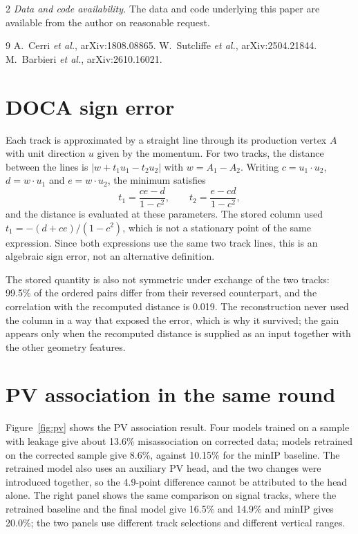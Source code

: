 \documentclass[10pt]{article}
\newcommand{\secnum}{\Roman{section}}
\begin{document}
\begin{multicols}{2}
\vspace{0.3em}
\noindent\emph{Data and code availability.} The data and code underlying this paper are available from the author on reasonable request.

\begin{thebibliography}{9}
\footnotesize
{} A.~Cerri \textit{et al.}, arXiv:1808.08865.
 W.~Sutcliffe \textit{et al.}, arXiv:2504.21844.
 M.~Barbieri \textit{et al.}, arXiv:2610.16021.
\end{thebibliography}

\appendix
\renewcommand{\secnum}{\Alph{section}}

\section{DOCA sign error}
\label{app:doca}

Each track is approximated by a straight line through its production vertex $A$ with unit direction $u$ given by the momentum. For two tracks, the distance between the lines is $|w+t_1u_1-t_2u_2|$ with $w=A_1-A_2$. Writing $c=u_1\cdot u_2$, $d=w\cdot u_1$ and $e=w\cdot u_2$, the minimum satisfies
\begin{equation}
t_1=\frac{ce-d}{1-c^2},\qquad t_2=\frac{e-cd}{1-c^2},
\end{equation}
and the distance is evaluated at these parameters. The stored column used $t_1=-(d+ce)/(1-c^2)$, which is not a stationary point of the same expression. Since both expressions use the same two track lines, this is an algebraic sign error, not an alternative definition.

The stored quantity is also not symmetric under exchange of the two tracks: 99.5\% of the ordered pairs differ from their reversed counterpart, and the correlation with the recomputed distance is 0.019. The reconstruction never used the column in a way that exposed the error, which is why it survived; the gain appears only when the recomputed distance is supplied as an input together with the other geometry features.

\section{PV association in the same round}
\label{app:pv}

Figure~\ref{fig:pv} shows the PV association result. Four models trained on a sample with leakage give about 13.6\% misassociation on corrected data; models retrained on the corrected sample give 8.6\%, against 10.15\% for the minIP baseline. The retrained model also uses an auxiliary PV head, and the two changes were introduced together, so the 4.9-point difference cannot be attributed to the head alone. The right panel shows the same comparison on signal tracks, where the retrained baseline and the final model give 16.5\% and 14.9\% and minIP gives 20.0\%; the two panels use different track selections and different vertical ranges.


\end{multicols}
\end{document}
